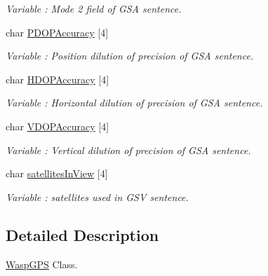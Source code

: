\begin{DoxyCompactItemize}
\begin{DoxyCompactList}\small\item\em Variable \+: Mode 2 field of G\+SA sentence. \end{DoxyCompactList}\item 
char \hyperlink{class_wasp_g_p_s_aeef9bca178ee975e48f3f9ca258a6a3a}{P\+D\+O\+P\+Accuracy} \mbox{[}4\mbox{]}\hypertarget{class_wasp_g_p_s_aeef9bca178ee975e48f3f9ca258a6a3a}{}\label{class_wasp_g_p_s_aeef9bca178ee975e48f3f9ca258a6a3a}

\begin{DoxyCompactList}\small\item\em Variable \+: Position dilution of precision of G\+SA sentence. \end{DoxyCompactList}\item 
char \hyperlink{class_wasp_g_p_s_a6d05a845aa17eb1a96c3ec1f638ead8f}{H\+D\+O\+P\+Accuracy} \mbox{[}4\mbox{]}\hypertarget{class_wasp_g_p_s_a6d05a845aa17eb1a96c3ec1f638ead8f}{}\label{class_wasp_g_p_s_a6d05a845aa17eb1a96c3ec1f638ead8f}

\begin{DoxyCompactList}\small\item\em Variable \+: Horizontal dilution of precision of G\+SA sentence. \end{DoxyCompactList}\item 
char \hyperlink{class_wasp_g_p_s_a56dec22b9c8d5f9ce7dd05efda5cfcd8}{V\+D\+O\+P\+Accuracy} \mbox{[}4\mbox{]}\hypertarget{class_wasp_g_p_s_a56dec22b9c8d5f9ce7dd05efda5cfcd8}{}\label{class_wasp_g_p_s_a56dec22b9c8d5f9ce7dd05efda5cfcd8}

\begin{DoxyCompactList}\small\item\em Variable \+: Vertical dilution of precision of G\+SA sentence. \end{DoxyCompactList}\item 
char \hyperlink{class_wasp_g_p_s_ab7fa9639a5448d1271c7593567a71f6f}{satellites\+In\+View} \mbox{[}4\mbox{]}\hypertarget{class_wasp_g_p_s_ab7fa9639a5448d1271c7593567a71f6f}{}\label{class_wasp_g_p_s_ab7fa9639a5448d1271c7593567a71f6f}

\begin{DoxyCompactList}\small\item\em Variable \+: satellites used in G\+SV sentence. \end{DoxyCompactList}\end{DoxyCompactItemize}


\subsection{Detailed Description}
\hyperlink{class_wasp_g_p_s}{Wasp\+G\+PS} Class. 

